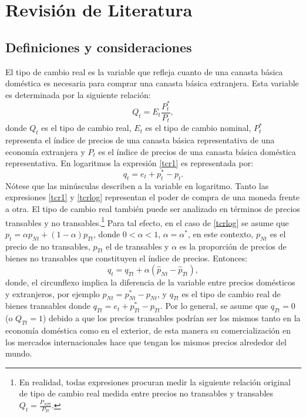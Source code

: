 \documentclass[12pt,letterpaper]{article}
\begin{document}
\section{Revisión de Literatura}\label{pre}

\subsection*{Definiciones y consideraciones}
El tipo de cambio real es la variable que refleja cuanto de una canasta básica doméstica es necesaria para comprar una canasta básica extranjera. Esta variable es determinada por la siguiente relación:
\begin{equation}\label{tcr1}
Q_t=E_t\frac{P_t^*}{P_t},
\end{equation}
donde $Q_t$ es el tipo de cambio real, $E_t$ es el tipo de cambio nominal, $P_t^*$ representa el índice de precios de una canasta básica representativa de una economía extranjera y $P_t$ es el índice de precios de una canasta básica doméstica representativa. En logaritmos la expresión \ref{tcr1} es representada por:
\begin{equation}\label{tcrlog}
q_t=e_t+p_t^*-p_t.
\end{equation}
Nótese que las minúsculas describen a la variable en logaritmo. Tanto las expresiones \ref{tcr1} y \ref{tcrlog} representan el poder de compra de una moneda frente a otra. El tipo de cambio real también puede ser analizado en términos de precios transables y no transables.\footnote{En realidad, todas expresiones procuran medir la siguiente relación original de tipo de cambio real medida entre precios no transables y transables $Q_t=\frac{P_{NTt}}{P_{Tt}}$.} Para tal efecto, en el caso de \ref{tcrlog} se asume que $p_t=\alpha p_{Nt} + (1-\alpha)p_{Tt}$, donde $0<\alpha<1$, $\alpha=\alpha^*$, en este contexto, $p_{Nt}$ es el precio de no transables, $p_{Tt}$ el de transables y $\alpha$ es la proporción de precios de bienes no transables que constituyen el índice de precios. Entonces:
\begin{equation}\label{tcr2}
q_t=q_{Tt}+\alpha(\hat{p}_{Nt}-\hat{p}_{Tt}),
\end{equation}
donde, el circunflexo implica la diferencia de la variable entre precios domésticos y extranjeros, por ejemplo $\hat{p}_{Nt}=p_{Nt}^*-p_{Nt}$, y $q_{Tt}$ es el tipo de cambio real de bienes transables donde $q_{Tt}=e_t+p_{Tt}^*-p_{Tt}$. Por lo general, se asume que $q_{Tt}=0$ (o $Q_{Tt}=1$) debido a que los precios transables podrían ser los mismos tanto en la economía doméstica como en el exterior, de esta manera su comercialización en los mercados internacionales hace que tengan los mismos precios alrededor del mundo. 
\end{document}
